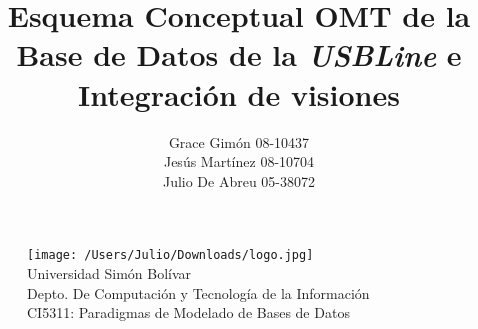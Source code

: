 \documentclass[12pt,a4paper,spanish]{article}
\begin{document}
\begin{figure}
  \centering
    \texttt{[image: /Users/Julio/Downloads/logo.jpg]}
     \\ Universidad Sim\'on Bol\'ivar
     \\ Depto. De Computaci\'on y Tecnolog\'ia de la Informaci\'on
     \\ CI5311: Paradigmas de Modelado de Bases de Datos
\end{figure} 

\title{Esquema Conceptual OMT de la Base de Datos de la \emph{USBLine}
e Integraci\'on de visiones}
\author{Grace Gim\'on 08-10437 \\
        Jes\'us Mart\'inez 08-10704\\
        Julio De Abreu 05-38072}

\maketitle
\newpage
\tableofcontents

\newpage
\end{document}

